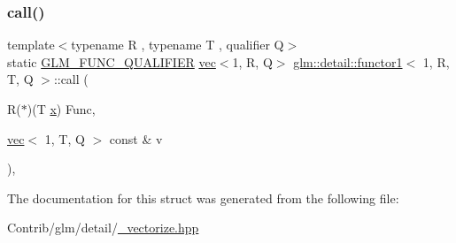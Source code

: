 \subsubsection{\texorpdfstring{call()}{call()}}
{\footnotesize\ttfamily template$<$typename R , typename T , qualifier Q$>$ \\
static \mbox{\hyperlink{setup_8hpp_a33fdea6f91c5f834105f7415e2a64407}{G\+L\+M\+\_\+\+F\+U\+N\+C\+\_\+\+Q\+U\+A\+L\+I\+F\+I\+ER}} \mbox{\hyperlink{structglm_1_1vec}{vec}}$<$1, R, Q$>$ \mbox{\hyperlink{structglm_1_1detail_1_1functor1}{glm\+::detail\+::functor1}}$<$ 1, R, T, Q $>$\+::call (\begin{DoxyParamCaption}\item[{R($\ast$)(T \mbox{\hyperlink{_s_d_l__opengl_8h_ad0e63d0edcdbd3d79554076bf309fd47}{x}})}]{Func,  }\item[{\mbox{\hyperlink{structglm_1_1vec}{vec}}$<$ 1, T, Q $>$ const \&}]{v }\end{DoxyParamCaption})\hspace{0.3cm}{\ttfamily [inline]}, {\ttfamily [static]}}



The documentation for this struct was generated from the following file\+:\begin{DoxyCompactItemize}
\item 
Contrib/glm/detail/\mbox{\hyperlink{__vectorize_8hpp}{\+\_\+vectorize.\+hpp}}\end{DoxyCompactItemize}
